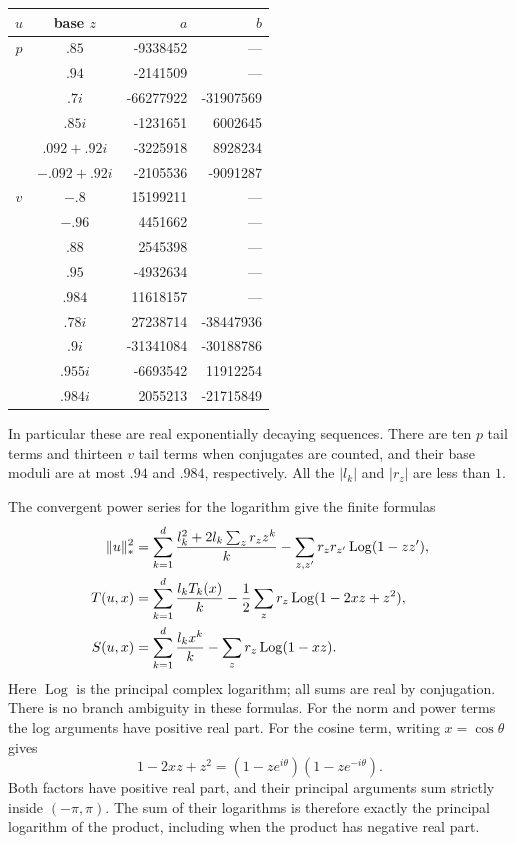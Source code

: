 \begin{center}
\begin{tabular}{ccrr}
\toprule
$u$&base $z$&$a$&$b$\\
\midrule
$p$&$.85$&-9338452&---\\
&$.94$&-2141509&---\\
&$.7i$&-66277922&-31907569\\
&$.85i$&-1231651&6002645\\
&$.092+.92i$&-3225918&8928234\\
&$-.092+.92i$&-2105536&-9091287\\
\midrule
$v$&$-.8$&15199211&---\\
&$-.96$&4451662&---\\
&$.88$&2545398&---\\
&$.95$&-4932634&---\\
&$.984$&11618157&---\\
&$.78i$&27238714&-38447936\\
&$.9i$&-31341084&-30188786\\
&$.955i$&-6693542&11912254\\
&$.984i$&2055213&-21715849\\
\bottomrule
\end{tabular}
\end{center}
In particular these are real exponentially decaying sequences.  There are
ten $p$ tail terms and thirteen $v$ tail terms when conjugates are counted,
and their base moduli are at most $.94$ and $.984$, respectively.
All the $|l_k|$ and $|r_z|$ are less than $1$.

The convergent power series for the logarithm give the finite formulas
\begin{align}
 \|u\|_*^2
 &=\sum_{k=1}^d\frac{l_k^2+2l_k\sum_zr_zz^k}{k}
             -\sum_{z,z'}r_zr_{z'}\operatorname{Log}(1-zz'),\notag\\
 T(u,x)&=\sum_{k=1}^d\frac{l_kT_k(x)}{k}
             -\frac12\sum_zr_z\operatorname{Log}(1-2xz+z^2),\notag\\
 S(u,x)&=\sum_{k=1}^d\frac{l_kx^k}{k}
             -\sum_zr_z\operatorname{Log}(1-xz).
 \label{eq:certificate-log-formulas}
\end{align}
Here $\operatorname{Log}$ is the principal complex logarithm; all sums are
real by conjugation.  There is no branch ambiguity in these formulas.
For the norm and power terms the log arguments have positive real part.
For the cosine term, writing $x=\cos\theta$ gives
\[
 1-2xz+z^2=(1-ze^{i\theta})(1-ze^{-i\theta}).
\]
Both factors have positive real part, and their principal arguments sum
strictly inside $(-\pi,\pi)$.  The sum of their logarithms is therefore
exactly the principal logarithm of the product, including when the product
has negative real part.

